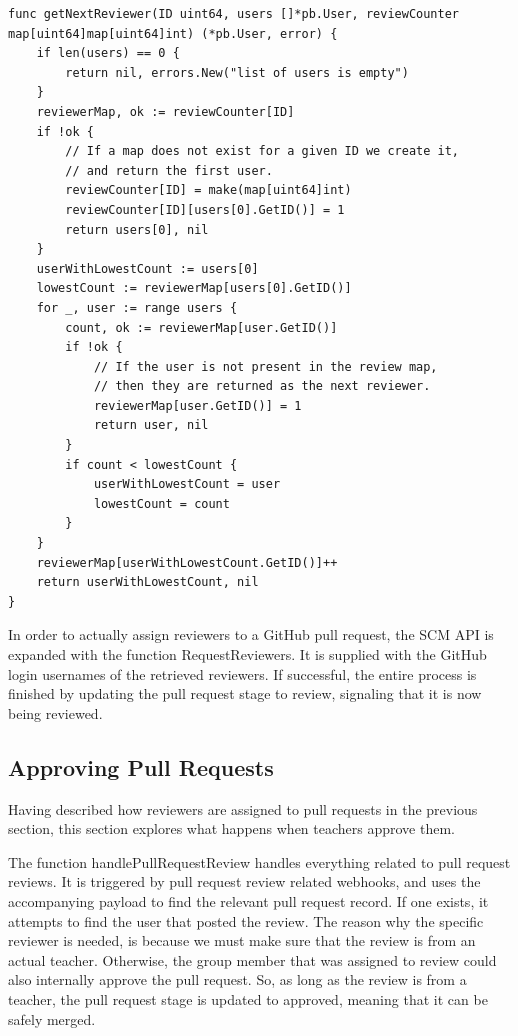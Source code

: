 \begin{lstlisting}[caption={The getNextReviewer function}, language=Golang, commentstyle={\slshape}]
func getNextReviewer(ID uint64, users []*pb.User, reviewCounter map[uint64]map[uint64]int) (*pb.User, error) {
	if len(users) == 0 {
		return nil, errors.New("list of users is empty")
	}
	reviewerMap, ok := reviewCounter[ID]
	if !ok {
		// If a map does not exist for a given ID we create it,
		// and return the first user.
		reviewCounter[ID] = make(map[uint64]int)
		reviewCounter[ID][users[0].GetID()] = 1
		return users[0], nil
	}
	userWithLowestCount := users[0]
	lowestCount := reviewerMap[users[0].GetID()]
	for _, user := range users {
		count, ok := reviewerMap[user.GetID()]
		if !ok {
			// If the user is not present in the review map,
			// then they are returned as the next reviewer.
			reviewerMap[user.GetID()] = 1
			return user, nil
		}
		if count < lowestCount {
			userWithLowestCount = user
			lowestCount = count
		}
	}
	reviewerMap[userWithLowestCount.GetID()]++
	return userWithLowestCount, nil
}
\end{lstlisting}

In order to actually assign reviewers to a GitHub pull request, the SCM API is expanded with the function RequestReviewers.
It is supplied with the GitHub login usernames of the retrieved reviewers.
If successful, the entire process is finished by updating the pull request stage to review, signaling that it is now being reviewed.

\subsection{Approving Pull Requests}

Having described how reviewers are assigned to pull requests in the previous section, this section explores what happens when teachers approve them.

The function handlePullRequestReview handles everything related to pull request reviews.
It is triggered by pull request review related webhooks, and uses the accompanying payload to find the relevant pull request record.
If one exists, it attempts to find the user that posted the review.
The reason why the specific reviewer is needed, is because we must make sure that the review is from an actual teacher.
Otherwise, the group member that was assigned to review could also internally approve the pull request.
So, as long as the review is from a teacher, the pull request stage is updated to approved, meaning that it can be safely merged.

